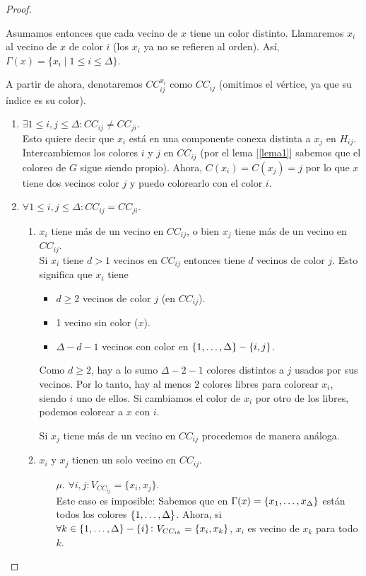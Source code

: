 \begin{proof}
\begin{enumerate}
    Asumamos entonces que cada vecino de $x$ tiene un color distinto. Llamaremos $x_i$ al vecino de $x$ de color $i$ (los $x_i$ ya no se refieren al orden). Así, $\Gamma(x) = \{x_i \mid 1 \le i \le \Delta\}$.

    A partir de ahora, denotaremos $CC^{x_i}_{ij}$ como $CC_{ij}$ (omitimos el vértice, ya que su índice es su color).
    \begin{enumerate}
    \item \label{CCneq} $\exists 1 \le i,j \le \Delta \colon CC_{ij} \neq CC_{ji}$.\\
    Esto quiere decir que $x_i$ está en una componente conexa distinta a $x_j$ en $H_{ij}$. Intercambiemos los colores $i$ y $j$ en $CC_{ij}$ (por el lema [\ref{lema1}] sabemos que el coloreo de $G$ sigue siendo propio). Ahora, $C(x_i) = C(x_j) = j$ por lo que $x$ tiene dos vecinos color $j$ y puedo colorearlo con el color $i$.
    
    \item $\forall 1 \le i,j \le \Delta \colon CC_{ij} = CC_{ji}$.
    \begin{enumerate}
    \item $x_i$ tiene más de un vecino en $CC_{ij}$, o bien $x_j$ tiene más de un vecino en $CC_{ij}$.\\
    Si $x_i$ tiene $d > 1$ vecinos en $CC_{ij}$ entonces tiene $d$ vecinos de color $j$. Esto significa que $x_i$ tiene
    \begin{itemize}
        \item $d \ge 2$ vecinos de color $j$ (en $CC_{ij}$).
        \item 1 vecino sin color ($x$).
        \item $\Delta - d - 1$ vecinos con color en $\{1, \mathellipsis, \Delta\} - \{i, j\}$.
    \end{itemize}
    Como $d \ge 2$, hay a lo sumo $\Delta - 2 - 1$ colores distintos a $j$ usados por sus vecinos. Por lo tanto, hay al menos $2$ colores libres para colorear $x_i$, siendo $i$ uno de ellos. Si cambiamos el color de $x_i$ por otro de los libres, podemos colorear a $x$ con $i$.
    
    Si $x_j$ tiene más de un vecino en $CC_{ij}$ procedemos de manera análoga.
    
    \item $x_i$ y $x_j$ tienen un solo vecino en $CC_{ij}$.
    \begin{itemize}
        \item [$\mu.$] $\forall i,j: V_{CC_{ij}} = \{x_i, x_j\}$.\\
        Este caso es imposible: Sabemos que en $\Gamma(x) = \{x_1, \mathellipsis, x_{\Delta}\}$ están todos los colores $\{1, \mathellipsis, \Delta\}$. Ahora, si $\forall k \in \{1, \mathellipsis, \Delta\} - \{i\} \colon V_{CC_{ik}} = \{x_i, x_k\}$, $x_i$ es vecino de $x_k$ para todo $k$.
        

\end{itemize}
\end{enumerate}
\end{enumerate}
\end{enumerate}
\end{proof}
